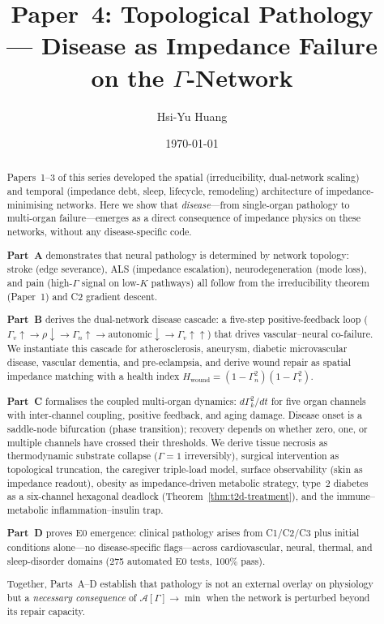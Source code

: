 \documentclass[aps,pre,twocolumn,superscriptaddress,floatfix]{revtex4-2}
\begin{document}
\title{Paper~4: Topological Pathology\\
--- Disease as Impedance Failure\\
on the $\Gamma$-Network}

\author{Hsi-Yu Huang}

\date{\today}

\begin{abstract}
Papers~1--3 of this series developed the spatial
(irreducibility, dual-network scaling) and temporal
(impedance debt, sleep, lifecycle, remodeling)
architecture of impedance-minimising networks.
Here we show that \emph{disease}---from single-organ
pathology to multi-organ failure---emerges as a
direct consequence of impedance physics on these
networks, without any disease-specific code.

\textbf{Part~A} demonstrates that neural pathology is
determined by network topology:
stroke (edge severance), ALS (impedance escalation),
neurodegeneration (mode loss), and pain (high-$\Gamma$
signal on low-$K$ pathways) all follow from the
irreducibility theorem (Paper~1) and C2
gradient descent.

\textbf{Part~B} derives the dual-network disease cascade:
a five-step positive-feedback loop
($\Gamma_v\!\uparrow \to \rho\!\downarrow \to
\Gamma_n\!\uparrow \to \text{autonomic}\!\downarrow
\to \Gamma_v\!\uparrow\!\uparrow$) that drives
vascular--neural co-failure.
We instantiate this cascade for atherosclerosis,
aneurysm, diabetic microvascular disease, vascular
dementia, and pre-eclampsia, and derive wound repair
as spatial impedance matching with a health index
$H_{\text{wound}} = (1-\Gamma_n^2)(1-\Gamma_v^2)$.

\textbf{Part~C} formalises the coupled multi-organ
dynamics:
$d\Gamma_k^2/dt$ for five organ channels with
inter-channel coupling, positive feedback,
and aging damage.
Disease onset is a saddle-node bifurcation (phase
transition); recovery depends on whether zero, one,
or multiple channels have crossed their thresholds.
We derive tissue necrosis as thermodynamic substrate
collapse ($\Gamma = 1$ irreversibly), surgical
intervention as topological truncation,
the caregiver triple-load model, surface
observability (skin as impedance readout),
obesity as impedance-driven metabolic strategy,
type~2 diabetes as a six-channel hexagonal deadlock
(Theorem~\ref{thm:t2d-treatment}),
and the immune--metabolic inflammation--insulin trap.

\textbf{Part~D} proves E0 emergence: clinical pathology
arises from C1/C2/C3 plus initial conditions alone---no
disease-specific flags---across cardiovascular,
neural, thermal, and sleep-disorder domains
(275 automated E0 tests, 100\% pass).

Together, Parts~A--D establish that pathology is not
an external overlay on physiology but a
\emph{necessary consequence} of
$\mathcal{A}[\Gamma] \to \min$ when the network is
perturbed beyond its repair capacity.
\end{abstract}
\end{document}
